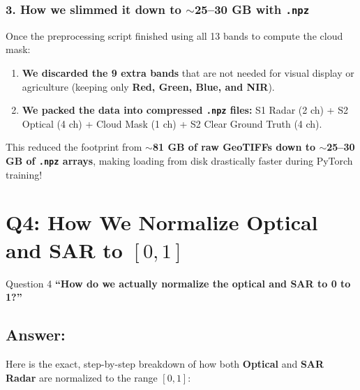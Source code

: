 \documentclass[11pt,a4paper]{article}
\begin{document}
\subsubsection*{3. How we slimmed it down to $\sim$25--30 GB with \texttt{.npz}}
Once the preprocessing script finished using all 13 bands to compute the cloud mask:
\begin{enumerate}[leftmargin=1.5em]
    \item \textbf{We discarded the 9 extra bands} that are not needed for visual display or agriculture (keeping only \textbf{Red, Green, Blue, and NIR}).
    \item \textbf{We packed the data into compressed \texttt{.npz} files:} S1 Radar (2 ch) + S2 Optical (4 ch) + Cloud Mask (1 ch) + S2 Clear Ground Truth (4 ch).
\end{enumerate}
This reduced the footprint from \textbf{$\sim$81 GB of raw GeoTIFFs down to $\sim$25--30 GB of \texttt{.npz} arrays}, making loading from disk drastically faster during PyTorch training!

\bigskip

\section{Q4: How We Normalize Optical and SAR to $[0, 1]$}

\begin{questionbox}{Question 4}
\textbf{``How do we actually normalize the optical and SAR to 0 to 1?''}
\end{questionbox}

\subsection*{Answer:}
Here is the exact, step-by-step breakdown of how both \textbf{Optical} and \textbf{SAR Radar} are normalized to the range \textbf{$[0, 1]$}:
\end{document}
